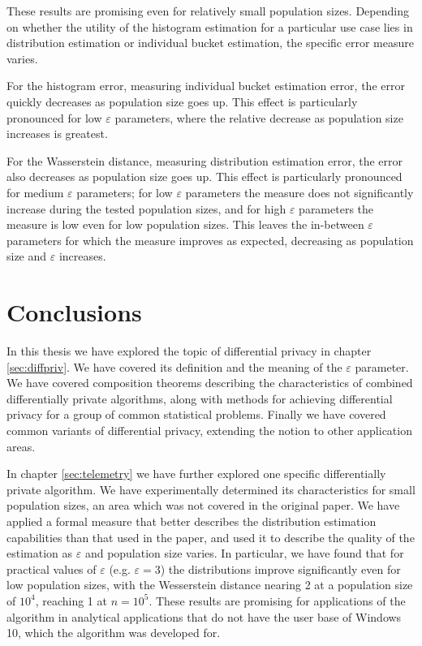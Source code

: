 \documentclass[12pt]{article}
\renewcommand{\epsilon}{\varepsilon}
\begin{document}
These results are promising even for relatively small population sizes. Depending on whether the utility of the histogram estimation for a particular use case lies in distribution estimation or individual bucket estimation, the specific error measure varies.

For the histogram error, measuring individual bucket estimation error, the error quickly decreases as population size goes up. This effect is particularly pronounced for low $\epsilon$ parameters, where the relative decrease as population size increases is greatest.

For the Wasserstein distance, measuring distribution estimation error, the error also decreases as population size goes up. This effect is particularly pronounced for medium $\epsilon$ parameters; for low $\epsilon$ parameters the measure does not significantly increase during the tested population sizes, and for high $\epsilon$ parameters the measure is low even for low population sizes. This leaves the in-between $\epsilon$ parameters for which the measure improves as expected, decreasing as population size and $\epsilon$ increases.

\section{Conclusions}

In this thesis we have explored the topic of differential privacy in chapter \ref{sec:diffpriv}. We have covered its definition and the meaning of the $\epsilon$ parameter. We have covered composition theorems describing the characteristics of combined differentially private algorithms, along with methods for achieving differential privacy for a group of common statistical problems. Finally we have covered common variants of differential privacy, extending the notion to other application areas.

In chapter \ref{sec:telemetry} we have further explored one specific differentially private algorithm. We have experimentally determined its characteristics for small population sizes, an area which was not covered in the original paper. We have applied a formal measure that better describes the distribution estimation capabilities than that used in the paper, and used it to describe the quality of the estimation as $\epsilon$ and population size varies. In particular, we have found that for practical values of $\epsilon$ (e.g. $\epsilon = 3$) the distributions improve significantly even for low population sizes, with the Wesserstein distance nearing 2 at a population size of $10^4$, reaching 1 at $n=10^5$. These results are promising for applications of the algorithm in analytical applications that do not have the user base of Windows 10, which the algorithm was developed for.
\end{document}
